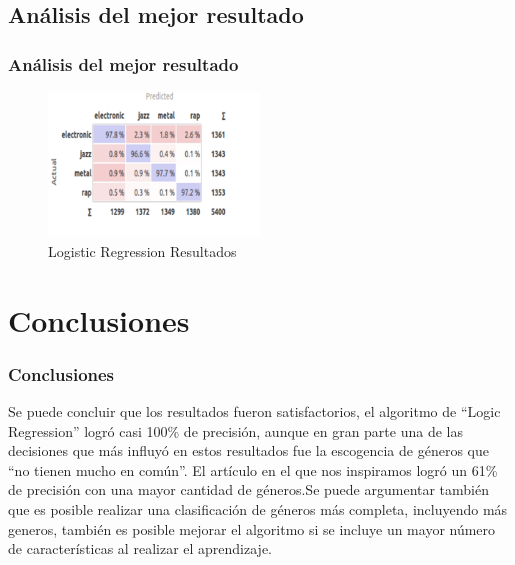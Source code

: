 \documentclass{beamer}
\begin{document}
\subsection{An\'{a}lisis del mejor resultado} %

\begin{frame}
\frametitle{An\'{a}lisis del mejor resultado}
\begin{figure}[ht]
  \caption{Logistic Regression Resultados}
  \centering
    \includegraphics[width=0.5\textwidth]{Images/LR_precision}
\end{figure}
\end{frame}


\section{Conclusiones} %

\begin{frame}
\frametitle{Conclusiones}
Se puede concluir que los resultados fueron satisfactorios, el algoritmo de “Logic Regression” logr\'{o} casi 100\% de precisi\'{o}n, aunque en gran parte una de las decisiones que m\'{a}s influy\'{o} en estos resultados fue la escogencia de g\'{e}neros que “no tienen mucho en com\'{u}n”. El art\'{i}culo en el que nos inspiramos logr\'{o} un 61\% de precisi\'{o}n con una mayor cantidad de g\'{e}neros.Se puede argumentar tambi\'{e}n que es posible realizar una clasificaci\'{o}n de g\'{e}neros m\'{a}s completa, incluyendo m\'{a}s generos, tambi\'{e}n es posible mejorar el algoritmo si se incluye un mayor n\'{u}mero de caracter\'{i}sticas al realizar el aprendizaje.
\end{frame}
\end{document}
